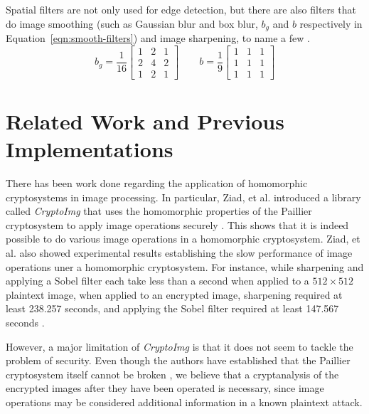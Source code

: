 Spatial filters are not only used for edge detection, but there are also filters that do image smoothing (such as Gaussian blur and box blur, $b_g$ and $b$ respectively in Equation~\ref{eqn:smooth-filters}) and image sharpening, to name a few \cite{gonzalez_digital_2008}.
\begin{equation}
    \label{eqn:smooth-filters}
    b_g = \frac{1}{16}
    \begin{bmatrix}
        1 & 2 & 1 \\
        2 & 4 & 2 \\
        1 & 2 & 1
    \end{bmatrix}
    \qquad
    b = \frac{1}{9}
    \begin{bmatrix}
        1 & 1 & 1 \\
        1 & 1 & 1 \\
        1 & 1 & 1
    \end{bmatrix}
\end{equation}


\section{Related Work and Previous Implementations}




There has been work done regarding the application of homomorphic cryptosystems in image processing. In particular, Ziad, et al. introduced a library called \textit{CryptoImg} that uses the homomorphic properties of the Paillier cryptosystem to apply image operations securely \cite{ziad_cryptoimg:_2016}. This shows that it is indeed possible to do various image operations in a homomorphic cryptosystem. Ziad, et al. also showed experimental results establishing the slow performance of image operations uner a homomorphic cryptosystem. For instance, while sharpening and applying a Sobel filter each take less than a second when applied to a $512\times 512$ plaintext image, when applied to an encrypted image, sharpening required at least 238.257 seconds, and applying the Sobel filter required at least 147.567 seconds \cite{ziad_cryptoimg:_2016}.

However, a major limitation of \textit{CryptoImg} is that it does not seem to tackle the problem of security. Even though the authors have established that the Paillier cryptosystem itself cannot be broken \cite{ziad_cryptoimg:_2016}, we believe that a cryptanalysis of the encrypted images after they have been operated is necessary, since image operations may be considered additional information in a known plaintext attack.

